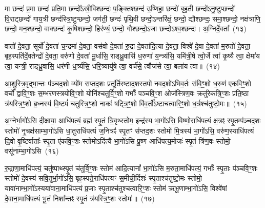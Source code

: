 {\anuvakamend[{छ॒र्दिषा॑ पिन्व॒ षट्च॑}]}%

मा छन्दः॑ प्र॒मा छन्दः॑ प्रति॒मा छन्दो᳚\-ऽस्री॒विश्छन्दः॑ प॒ङ्क्तिश्छन्द॑ उ॒ष्णिहा॒ छन्दो॑ बृह॒ती छन्दो॑\-ऽनु॒ष्टुप्छन्दो॑ वि॒राट्छन्दो॑ गाय॒त्री छन्द॑स्त्रि॒ष्टुप्छन्दो॒ जग॑ती॒ छन्दः॑ पृथि॒वी छन्दो॒\-ऽन्तरि॑क्षं॒ छन्दो॒ द्यौश्छन्दः॒ समा॒श्छन्दो॒ नक्ष॑त्राणि॒ छन्दो॒ मन॒श्छन्दो॒ वाक्छन्दः॑ कृ॒षिश्छन्दो॒ हिर॑ण्यं॒ छन्दो॒ गौश्छन्दो॒\-ऽजा छन्दो\-ऽश्व॒श्छन्दः॑। अ॒ग्निर्दे॒वता᳚~(१३)

वातो॑ दे॒वता॒ सूर्यो॑ दे॒वता॑ च॒न्द्रमा॑ दे॒वता॒ वस॑वो दे॒वता॑ रु॒द्रा दे॒वता॑दि॒त्या दे॒वता॒ विश्वे॑ दे॒वा दे॒वता॑ म॒रुतो॑ दे॒वता॒ बृह॒स्पति॑र्दे॒वतेन्द्रो॑ दे॒वता॒ वरु॑णो दे॒वता॑ मू॒र्धासि॒ राड्ध्रु॒वासि॑ ध॒रुणा॑ य॒न्त्र्य॑सि॒ यमि॑त्री॒षे त्वो॒र्जे त्वा॑ कृ॒ष्यै त्वा॒ क्षेमा॑य त्वा॒ यन्त्री॒ राड्ध्रु॒वासि॒ धर॑णी ध॒र्त्र्य॑सि॒ धरि॒त्र्यायु॑षे त्वा॒ वर्च॑से॒ त्वौज॑से त्वा॒ बला॑य त्वा॥~(१४)

{\anuvakamend[{दे॒वता\-ऽ\-ऽयु॑षे त्वा॒ षट्च॑}]}%

आ॒शुस्त्रि॒वृद्भा॒न्तः प॑ञ्चद॒शो व्यो॑म सप्तद॒शः प्रतू᳚र्तिरष्टाद॒शस्तपो॑ नवद॒शो॑\-ऽभिव॒र्तः स॑वि॒ꣳ॒शो ध॒रुण॑ एकवि॒ꣳ॒शो वर्चो᳚ द्वावि॒ꣳ॒शः स॒म्भर॑णस्त्रयोवि॒ꣳ॒शो योनि॑श्चतुर्वि॒ꣳ॒शो गर्भाः᳚ पञ्चवि॒ꣳ॒श ओज॑स्त्रिण॒वः क्रतु॑रेकत्रि॒ꣳ॒शः प्र॑ति॒ष्ठा त्र॑यस्त्रि॒ꣳ॒शो ब्र॒ध्नस्य॑ वि॒ष्टपं॑ चतुस्त्रि॒ꣳ॒शो नाकः॑ षट्त्रि॒ꣳ॒शो वि॑व॒र्तो᳚\-ऽष्टाचत्वारि॒ꣳ॒शो ध॒र्त्रश्च॑तुष्टो॒मः॥~(१५)

{\anuvakamend[{आ॒शुः स॒प्तत्रिꣳ॑शत्}]}%

अ॒ग्नेर्भा॒गो॑\-ऽसि दी॒क्षाया॒ आधि॑पत्यं॒ ब्रह्म॑ स्पृ॒तं त्रि॒वृथ्स्तोम॒ इन्द्र॑स्य भा॒गो॑\-ऽसि॒ विष्णो॒राधि॑पत्यं क्ष॒त्रꣴ स्पृ॒तम्प॑ञ्चद॒शः स्तोमो॑ नृ॒चक्ष॑साम्भा॒गो॑\-ऽसि धा॒तुराधि॑पत्यं ज॒नित्रꣴ॑ स्पृ॒तꣳ स॑प्तद॒शः स्तोमो॑ मि॒त्रस्य॑ भा॒गो॑\-ऽसि॒ वरु॑ण॒स्याधि॑पत्यं दि॒वो वृ॒ष्टिर्वाताः᳚ स्पृ॒ता ए॑कवि॒ꣳ॒शः स्तोमो\-ऽदि॑त्यै भा॒गो॑\-ऽसि पू॒ष्ण आधि॑पत्य॒मोजः॑ स्पृ॒तं त्रि॑ण॒वः स्तोमो॒ वसू॑नाम्भा॒गो॑\-ऽसि~(१६)

रु॒द्राणा॒माधि॑पत्यं॒ चतु॑ष्पाथ्स्पृ॒तं च॑तुर्वि॒ꣳ॒शः स्तोम॑ आदि॒त्यानां᳚ भा॒गो॑\-ऽसि म॒रुता॒माधि॑पत्यं॒ गर्भाः᳚ स्पृ॒ताः प॑ञ्चवि॒ꣳ॒शः स्तोमो॑ दे॒वस्य॑ सवि॒तुर्भा॒गो॑\-ऽसि॒ बृह॒स्पते॒राधि॑पत्यꣳ स॒मीची॒र्दिशः॑ स्पृ॒ताश्च॑तुष्टो॒मः स्तोमो॒ यावा॑नाम्भा॒गो᳚\-ऽस्यया॑वाना॒माधि॑पत्यं प्र॒जाः स्पृ॒ताश्च॑तुश्चत्वारि॒ꣳ॒शः स्तोम॑ ऋभू॒णाम्भा॒गो॑\-ऽसि॒ विश्वे॑षां दे॒वाना॒माधि॑पत्यं भू॒तं निशा᳚न्तꣴ स्पृ॒तं त्र॑यस्त्रि॒ꣳ॒शः स्तोमः॑॥~(१७)

{\anuvakamend[{वसू॑नां भा॒गो॑\-ऽसि॒ षट्च॑त्वारिꣳशच्च}]}%

